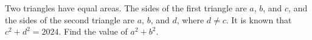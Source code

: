 Two triangles have equal areas. The sides of the first triangle are $a$, $b$, and $c$, and the sides of the second triangle are $a$, $b$, and $d$, where $d \neq c$. It is known that $c^{2}+d^{2}=2024$. Find the value of $a^{2}+b^{2}$.
